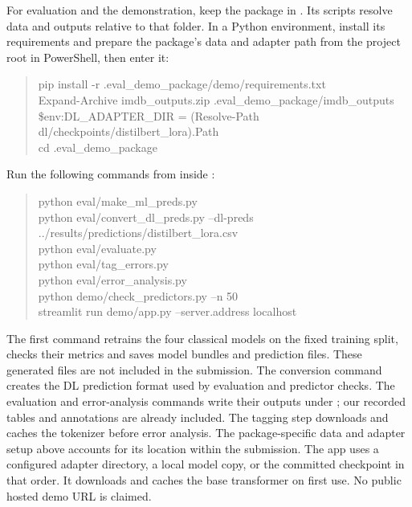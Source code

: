 \begin{samepage}
For evaluation and the demonstration, keep the package in
. Its scripts resolve data and outputs relative to
that folder. In a Python environment, install its requirements and prepare
the package's data and adapter path from the project root in PowerShell,
then enter it:
\begin{quote}\ttfamily\small
pip install -r .eval\_demo\_package/demo/requirements.txt\\
Expand-Archive imdb\_outputs.zip .eval\_demo\_package/imdb\_outputs\\
\$env:DL\_ADAPTER\_DIR = (Resolve-Path dl/checkpoints/distilbert\_lora).Path\\
cd .eval\_demo\_package
\end{quote}
\end{samepage}
Run the following commands from inside :
\begin{quote}\ttfamily\footnotesize
python eval/make\_ml\_preds.py\\
python eval/convert\_dl\_preds.py --dl-preds ../results/predictions/distilbert\_lora.csv\\
python eval/evaluate.py\\
python eval/tag\_errors.py\\
python eval/error\_analysis.py\\
python demo/check\_predictors.py --n 50\\
streamlit run demo/app.py --server.address localhost
\end{quote}
The first command retrains the four classical models on the fixed training
split, checks their metrics and saves model bundles and prediction files.
These generated files are not included in the submission. The conversion
command creates the DL prediction format used by evaluation and predictor checks.
The evaluation and error-analysis commands write their outputs under
; our recorded tables and annotations are already included.
The tagging step downloads and caches the tokenizer before error analysis.
The package-specific data and adapter setup above accounts for its location
within the submission.
The app uses a configured adapter directory, a local model copy, or the committed
checkpoint in that order. It downloads and caches the base transformer on first
use. No public hosted demo URL is claimed.

